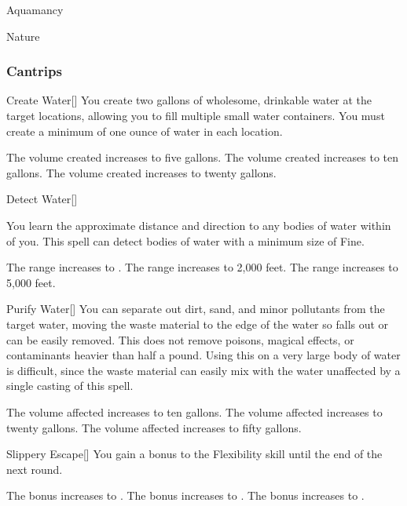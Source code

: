 \newpage
\begin{spellsection}{Aquamancy}

\begin{spellheader}
\end{spellheader}


 Nature

\subsubsection{Cantrips}


\begin{freeability}{Create Water}[]
You create two gallons of wholesome, drinkable water at the target locations, allowing you to fill multiple small water containers.
You must create a minimum of one ounce of water in each location.

\rankline
{} The volume created increases to five gallons.
 The volume created increases to ten gallons.
 The volume created increases to twenty gallons.
\end{freeability}


\begin{freeability}{Detect Water}[]

You learn the approximate distance and direction to any bodies of water within \rnglong {} of you.
This spell can detect bodies of water with a minimum size of Fine.

\rankline
{} The range increases to \rngext.
 The range increases to 2,000 feet.
 The range increases to 5,000 feet.
\end{freeability}


\begin{freeability}{Purify Water}[]
You can separate out dirt, sand, and minor pollutants from the target water, moving the waste material to the edge of the water so falls out or can be easily removed.
This does not remove poisons, magical effects, or contaminants heavier than half a pound.
Using this on a very large body of water is difficult, since the waste material can easily mix with the water unaffected by a single casting of this spell.

\rankline
{} The volume affected increases to ten gallons.
 The volume affected increases to twenty gallons.
 The volume affected increases to fifty gallons.
\end{freeability}


\begin{freeability}{Slippery Escape}[]
You gain a  bonus to the Flexibility skill until the end of the next round.

\rankline
{} The bonus increases to .
 The bonus increases to .
 The bonus increases to .
\end{freeability}

\end{spellsection}


